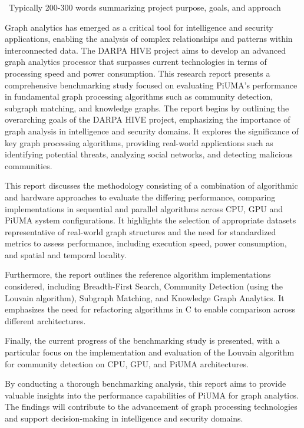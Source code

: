 \documentclass[letterpaper, 10pt]{article}
\begin{document}
\abstractname{~Typically 200-300 words summarizing project purpose, goals, and approach~}
\newline\par
\setlength{\parindent}{20pt}
Graph analytics has emerged as a critical tool for intelligence and security applications, enabling the analysis of complex relationships and patterns within interconnected data. The DARPA HIVE project aims to develop an advanced graph analytics processor that surpasses current technologies in terms of processing speed and power consumption. This research report presents a comprehensive benchmarking study focused on evaluating PiUMA's performance in fundamental graph processing algorithms such as community detection, subgraph matching, and knowledge graphs.
The report begins by outlining the overarching goals of the DARPA HIVE project, emphasizing the importance of graph analysis in intelligence and security domains. It explores the significance of key graph processing algorithms, providing real-world applications such as identifying potential threats, analyzing social networks, and detecting malicious communities. 

 This report discusses the methodology consisting of a combination of algorithmic and hardware approaches to evaluate the differing performance, comparing implementations in sequential and parallel algorithms across CPU, GPU and PiUMA system configurations. It highlights the selection of appropriate datasets representative of real-world graph structures and the need for standardized metrics to assess performance, including execution speed, power consumption, and spatial and temporal locality.

Furthermore, the report outlines the reference algorithm implementations considered, including Breadth-First Search, Community Detection (using the Louvain algorithm), Subgraph Matching, and Knowledge Graph Analytics. It emphasizes the need for refactoring algorithms in C to enable comparison across different architectures.

Finally, the current progress of the benchmarking study is presented, with a particular focus on the implementation and evaluation of the Louvain algorithm for community detection on CPU, GPU, and PiUMA architectures.

By conducting a thorough benchmarking analysis, this report aims to provide valuable insights into the performance capabilities of PiUMA for graph analytics. The findings will contribute to the advancement of graph processing technologies and support decision-making in intelligence and security domains.
\end{document}
